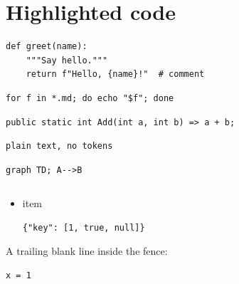 \documentclass[
]{article}
\author{}
\date{}
\begin{document}
\section{Highlighted code}\label{highlighted-code}

\begin{verbatim}
def greet(name):
    """Say hello."""
    return f"Hello, {name}!"  # comment
\end{verbatim}

\begin{verbatim}
for f in *.md; do echo "$f"; done
\end{verbatim}

\begin{verbatim}
public static int Add(int a, int b) => a + b;
\end{verbatim}

\begin{verbatim}
plain text, no tokens
\end{verbatim}

\begin{verbatim}
graph TD; A-->B
\end{verbatim}

\begin{verbatim}
\end{verbatim}

\begin{itemize}
\item
  item

\begin{verbatim}
{"key": [1, true, null]}
\end{verbatim}
\end{itemize}

A trailing blank line inside the fence:

\begin{verbatim}
x = 1
\end{verbatim}
\end{document}
